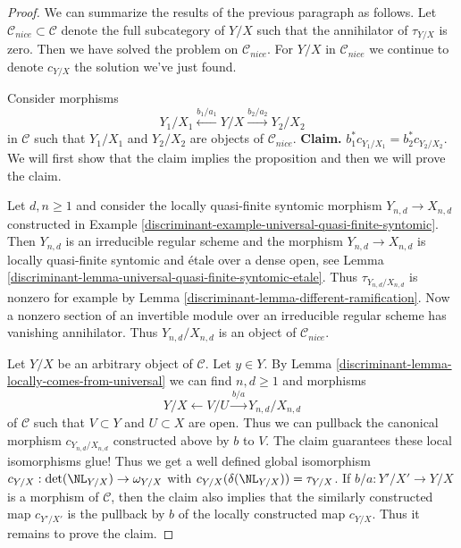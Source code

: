 \begin{proof}
\medskip\noindent
We can summarize the results of the previous paragraph as follows.
Let $\mathcal{C}_{nice} \subset \mathcal{C}$ denote the
full subcategory of $Y/X$ such that the annihilator of
$\tau_{Y/X}$ is zero. Then we have solved the problem
on $\mathcal{C}_{nice}$. For $Y/X$ in $\mathcal{C}_{nice}$
we continue to denote $c_{Y/X}$ the solution we've just found.

\medskip\noindent
Consider morphisms
$$
Y_1/X_1 \xleftarrow{b_1/a_1} Y/X \xrightarrow{b_2/a_2} Y_2/X_2
$$
in $\mathcal{C}$ such that $Y_1/X_1$ and $Y_2/X_2$ are objects
of $\mathcal{C}_{nice}$. {\bf Claim.} $b_1^*c_{Y_1/X_1} = b_2^*c_{Y_2/X_2}$.
We will first show that the claim implies the proposition
and then we will prove the claim.

\medskip\noindent
Let $d, n \geq 1$ and consider the locally
quasi-finite syntomic morphism $Y_{n, d} \to X_{n, d}$
constructed in Example \ref{discriminant-example-universal-quasi-finite-syntomic}.
Then $Y_{n, d}$ is an irreducible regular scheme and the
morphism $Y_{n, d} \to X_{n, d}$ is locally quasi-finite syntomic
and \'etale over a dense open, see
Lemma \ref{discriminant-lemma-universal-quasi-finite-syntomic-etale}.
Thus $\tau_{Y_{n, d}/X_{n, d}}$ is nonzero for example by
Lemma \ref{discriminant-lemma-different-ramification}. Now a nonzero section
of an invertible module over an irreducible regular scheme
has vanishing annihilator. Thus
$Y_{n, d}/X_{n, d}$ is an object of $\mathcal{C}_{nice}$.

\medskip\noindent
Let $Y/X$ be an arbitrary object of $\mathcal{C}$. Let $y \in Y$.
By Lemma \ref{discriminant-lemma-locally-comes-from-universal} we can find
$n, d \geq 1$ and morphisms
$$
Y/X \leftarrow V/U \xrightarrow{b/a} Y_{n, d}/X_{n, d}
$$
of $\mathcal{C}$ such that $V \subset Y$ and $U \subset X$ are open.
Thus we can pullback the canonical morphism $c_{Y_{n, d}/X_{n, d}}$
constructed above by $b$ to $V$. The claim guarantees these local
isomorphisms glue! Thus we get a well defined global isomorphism
$c_{Y/X} : \det(\NL_{Y/X}) \to \omega_{Y/X}$ with
$c_{Y/X}(\delta(\NL_{Y/X})) = \tau_{Y/X}$.
If $b/a : Y'/X' \to Y/X$ is a morphism of $\mathcal{C}$, then
the claim also implies that the similarly constructed map
$c_{Y'/X'}$ is the pullback by $b$ of the locally constructed
map $c_{Y/X}$. Thus it remains to prove the claim.


\end{proof}
